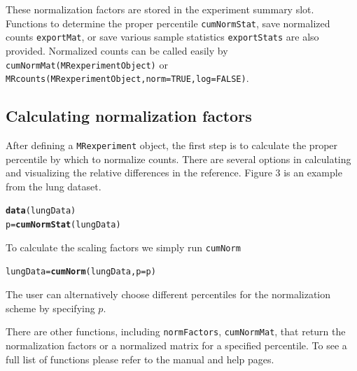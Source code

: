 \documentclass[a4paper,11pt]{article}\usepackage[]{graphicx}\usepackage[]{color}
\makeatletter
\newcommand{\hlstd}[1]{\textcolor[rgb]{0.345,0.345,0.345}{#1}}%
\newcommand{\hlkwb}[1]{\textcolor[rgb]{0.69,0.353,0.396}{#1}}%
\newcommand{\hlkwc}[1]{\textcolor[rgb]{0.333,0.667,0.333}{#1}}%
\newcommand{\hlkwd}[1]{\textcolor[rgb]{0.737,0.353,0.396}{\textbf{#1}}}%
\newenvironment{kframe}{%
 \def\at@end@of@kframe{}%
 \ifinner\ifhmode%
  \def\at@end@of@kframe{\end{minipage}}%
  \begin{minipage}{\columnwidth}%
 \fi\fi%
 \def\FrameCommand##1{\hskip\@totalleftmargin \hskip-\fboxsep
 \colorbox{shadecolor}{##1}\hskip-\fboxsep
     \hskip-\linewidth \hskip-\@totalleftmargin \hskip\columnwidth}%
 \MakeFramed {\advance\hsize-\width
   \@totalleftmargin\z@ \linewidth\hsize
   \@setminipage}}%
 {\par\unskip\endMakeFramed%
 \at@end@of@kframe}
\newenvironment{knitrout}{}{} %
\makeatother
\begin{document}
These normalization factors are stored in the experiment summary slot. Functions to determine the proper percentile \texttt{cumNormStat}, save normalized counts \texttt{exportMat}, or save various sample statistics \texttt{exportStats} are also provided.
Normalized counts can be called easily by \texttt{cumNormMat(MRexperimentObject)} or \texttt{MRcounts(MRexperimentObject,norm=TRUE,log=FALSE)}.

\subsection{Calculating normalization factors}
After defining a \texttt{MRexperiment} object, the first step is to calculate the proper percentile by which to normalize counts. There are several options in calculating and visualizing the relative differences in the reference. Figure 3 is an example from the lung dataset.

\begin{knitrout}
\color{fgcolor}\begin{kframe}
\begin{alltt}
\hlkwd{data}\hlstd{(lungData)}
\hlstd{p} \hlkwb{=} \hlkwd{cumNormStat}\hlstd{(lungData)}
\end{alltt}
\end{kframe}
\end{knitrout}


\noindent
To calculate the scaling factors we simply run \texttt{cumNorm}

\begin{knitrout}
\color{fgcolor}\begin{kframe}
\begin{alltt}
\hlstd{lungData} \hlkwb{=} \hlkwd{cumNorm}\hlstd{(lungData,} \hlkwc{p} \hlstd{= p)}
\end{alltt}
\end{kframe}
\end{knitrout}


The user can alternatively choose different percentiles for the normalization scheme by specifying $p$.

There are other functions, including \texttt{normFactors}, \texttt{cumNormMat}, that return the normalization factors or a normalized matrix for a specified percentile. To see a full list of functions please refer to the manual and help pages. 
\end{document}
